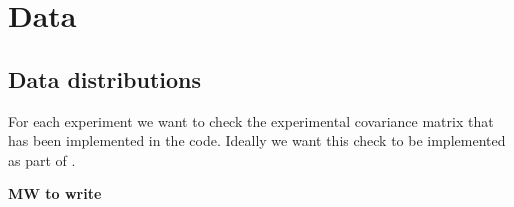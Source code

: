 \section{Data}
\label{sec:data}

\subsection{Data distributions}
\label{eq:data-distr}
For each experiment we want to check the experimental covariance matrix that has
been implemented in the \nnpdf code. Ideally we want this check to be
implemented as part of \valid. 

{\bf MW to write}